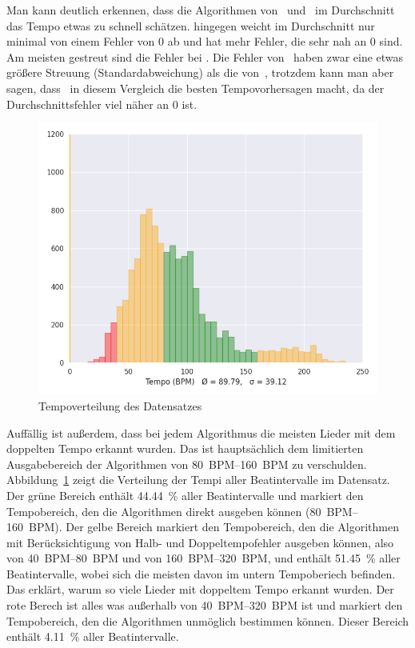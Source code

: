 {{		%
		Man kann deutlich erkennen,
			dass die Algorithmen von~\cite{2001_BeatThis} und~\cite{2011_PlRoSt} im Durchschnitt das Tempo etwas zu schnell schätzen.
		\cite{2009_DaPlSt} hingegen weicht im Durchschnitt nur minimal von einem Fehler von 0 ab und
			hat mehr Fehler, die sehr nah an 0 sind.
		Am meisten gestreut sind die Fehler bei \cite{2001_BeatThis}.
		Die Fehler von~\cite{2009_DaPlSt} haben zwar eine etwas grö{\ss}ere Streuung (Standardabweichung) als die von~\cite{2011_PlRoSt},
			trotzdem kann man aber sagen,
			dass~\cite{2009_DaPlSt} in diesem Vergleich die besten Tempovorhersagen macht,
			da der Durchschnittsfehler viel näher an 0 ist.

		\begin{figure}[h]
			\centering
			\includegraphics[scale=0.45]{resources/dataset_tempo_histogram.png}
			\caption{Tempoverteilung des Datensatzes}
			\label{fig:dataset_tempo}
		\end{figure}

		Auffällig ist au{\ss}erdem,
			dass bei jedem Algorithmus die meisten Lieder mit dem doppelten Tempo erkannt wurden.
		Das ist hauptsächlich dem limitierten Ausgabebereich der Algorithmen von \SIrange{80}{160}{BPM} zu verschulden.
		Abbildung~\ref{fig:dataset_tempo} zeigt die Verteilung der Tempi aller Beatintervalle im Datensatz.
		Der grüne Bereich enthält \SI{44.44}{\percent} aller Beatintervalle
			und markiert den Tempobereich,
			den die Algorithmen direkt ausgeben können (\SIrange{80}{160}{BPM}).
		Der gelbe Bereich markiert den Tempobereich,
			den die Algorithmen mit Berücksichtigung von Halb- und Doppeltempofehler ausgeben können,
			also von \SIrange{40}{80}{BPM} und von \SIrange{160}{320}{BPM},
			und enthält \SI{51.45}{\percent} aller Beatintervalle,
			wobei sich die meisten davon im untern Tempoberiech befinden.
		Das erklärt,
			warum so viele Lieder mit doppeltem Tempo erkannt wurden.
		Der rote Berech ist alles was au{\ss}erhalb von \SIrange{40}{320}{BPM} ist
			und markiert den Tempobereich,
			den die Algorithmen unmöglich bestimmen können.
		Dieser Bereich enthält \SI{4.11}{\percent} aller Beatintervalle.
	}

}
